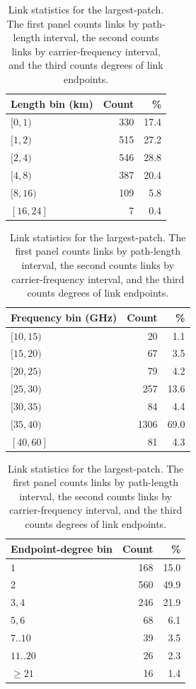 \documentclass[a4paper,fleqn]{cas-sc}
\begin{document}
\begin{table}[!htbp]
  \centering
  \begin{minipage}[t]{0.31\textwidth}
    \centering
    \scriptsize
    \begin{tabular}{lrr}
      \toprule
      Length bin (km) & Count & \%   \\
      \midrule
      $[0,1)$         & 330   & 17.4 \\
      $[1,2)$         & 515   & 27.2 \\
      $[2,4)$         & 546   & 28.8 \\
      $[4,8)$         & 387   & 20.4 \\
      $[8,16)$        & 109   & 5.8  \\
      $[16,24]$       & 7     & 0.4  \\
      \bottomrule
    \end{tabular}
  \end{minipage}
  \hfill
  \begin{minipage}[t]{0.31\textwidth}
    \centering
    \scriptsize
    \begin{tabular}{lrr}
      \toprule
      Frequency bin (GHz) & Count & \%   \\
      \midrule
      $[10,15)$           & 20    & 1.1  \\
      $[15,20)$           & 67    & 3.5  \\
      $[20,25)$           & 79    & 4.2  \\
      $[25,30)$           & 257   & 13.6 \\
      $[30,35)$           & 84    & 4.4  \\
      $[35,40)$           & 1306  & 69.0 \\
      $[40,60]$           & 81    & 4.3  \\
      \bottomrule
    \end{tabular}
  \end{minipage}
  \hfill
  \begin{minipage}[t]{0.31\textwidth}
    \centering
    \scriptsize
    \begin{tabular}{lrr}
      \toprule
      Endpoint-degree bin & Count & \%   \\
      \midrule
	      $1$ & 168 & 15.0 \\
	      $2$ & 560 & 49.9 \\
	      $3,4$ & 246 & 21.9 \\
	      $5,6$ & 68 & 6.1 \\
	      $7..10$ & 39 & 3.5 \\
	      $11..20$ & 26 & 2.3 \\
	      $\geq 21$ & 16 & 1.4 \\
      \bottomrule
    \end{tabular}
  \end{minipage}
  \caption{Link statistics for the largest-patch. The first panel counts links by path-length interval, the second counts links by carrier-frequency interval, and the third counts degrees of link endpoints.}
  \label{tab:largest_patch_distributions}
\end{table}
\end{document}
